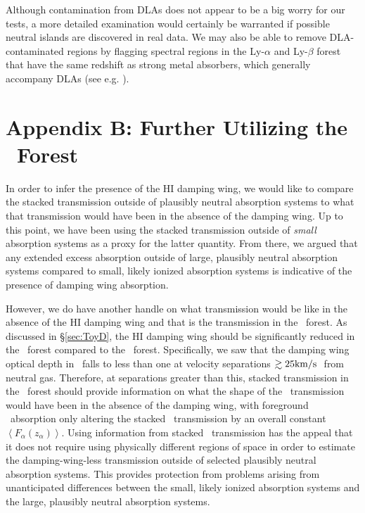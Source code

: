 Although contamination from DLAs does not appear to be a big worry for our tests, a more detailed examination would
certainly be warranted if possible neutral islands are discovered in real data. We may also be able to remove
DLA-contaminated regions by flagging spectral regions in the Ly-$\alpha$ and Ly-$\beta$ forest that have the same redshift
as strong metal absorbers, which generally accompany DLAs (see e.g. \citealt{Wolfe:2005jd}). 


\section*{Appendix B: Further Utilizing the \lyb\ Forest} \label{sec:BetaHandle}




In order to infer the presence of the HI damping wing, we would like to compare the stacked transmission outside of plausibly neutral absorption systems to what that transmission would have been in the absence of the damping wing. Up to this point, we have been using the stacked transmission outside of \textit{small} absorption systems as a proxy for the latter quantity. From there, we argued that any extended excess absorption outside of large, plausibly neutral absorption systems compared to small, likely ionized absorption systems is indicative of the presence of damping wing absorption. 


However, we do have another handle on what transmission would be like in the absence of the HI damping wing and that is the transmission in the \lyb\ forest. As discussed in \S\ref{sec:ToyD}, the HI damping wing should be significantly reduced in the \lyb\ forest compared to the \lya\ forest. Specifically, we saw that the damping wing optical depth in \lyb\ falls to less than one at velocity separations $\gtrsim 25\text{km}/\text{s}\ $ from neutral gas. Therefore, at separations greater than this, stacked transmission in the \lyb\ forest should provide information on what the shape of the \lya\ transmission would have been in the absence of the damping wing, with foreground \lya\ absorption only altering the stacked \lyb\ transmission by an overall constant $\left\langle F_{\alpha}(z_{\alpha}) \right\rangle$. Using information from stacked \lyb\ transmission has the appeal that it does not require using physically different regions of space in order to estimate the damping-wing-less transmission outside of selected plausibly neutral absorption systems. This provides protection from problems arising from unanticipated differences between the small, likely ionized absorption systems and the large, plausibly neutral absorption systems.


